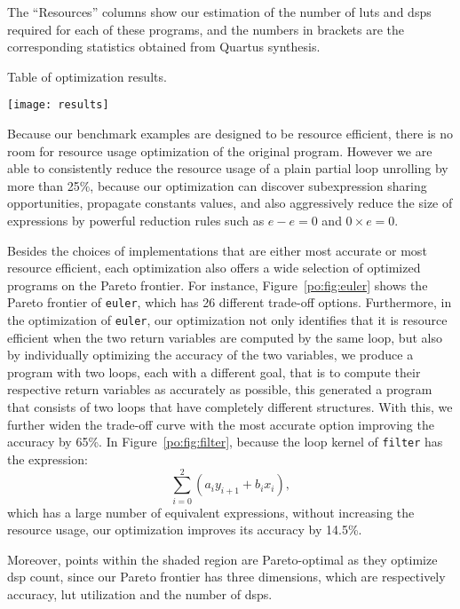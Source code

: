 The ``Resources'' columns show our estimation of the number of \glspl{lut}
and \glspl{dsp} required for each of these programs, and the numbers in
brackets are the corresponding statistics obtained from Quartus synthesis.

\begin{table}[ht]
    \centering
    \caption{
        Table of optimization results.
    }\label{po:fig:results}
    \texttt{[image: results]}
\end{table}

Because our benchmark examples are designed to be resource efficient, there
is no room for resource usage optimization of the original program.  However
we are able to consistently reduce the resource usage of a plain partial
loop unrolling by more than 25\%, because our optimization can discover
subexpression sharing opportunities, propagate constants values, and also
aggressively reduce the size of expressions by powerful reduction rules such as
$e - e = 0$ and $0 \times e = 0$.

Besides the choices of implementations that are either most accurate or most
resource efficient, each optimization also offers a wide selection of optimized
programs on the Pareto frontier.  For instance, Figure~\ref{po:fig:euler}
shows the Pareto frontier of \texttt{euler}, which has 26 different trade-off
options.  Furthermore, in the optimization of \texttt{euler}, our optimization
not only identifies that it is resource efficient when the two return variables
are computed by the same loop, but also by individually optimizing the
accuracy of the two variables, we produce a program with two loops, each with
a different goal, that is to compute their respective return variables as
accurately as possible, this generated a program that consists of two loops
that have completely different structures.  With this, we further widen the
trade-off curve with the most accurate option improving the accuracy by 65\%.
In Figure~\ref{po:fig:filter}, because the loop kernel of \texttt{filter}
has the expression:
\begin{equation}
    \sum_{i=0}^2{\left( a_i y_{i+1} + b_i x_i \right)},
\end{equation}
which has a large number of equivalent expressions, without increasing the
resource usage, our optimization improves its accuracy by 14.5\%.

Moreover, points within the shaded region are Pareto-optimal as they optimize
\gls{dsp} count, since our Pareto frontier has three dimensions, which are
respectively accuracy, \gls{lut} utilization and the number of \glspl{dsp}.

